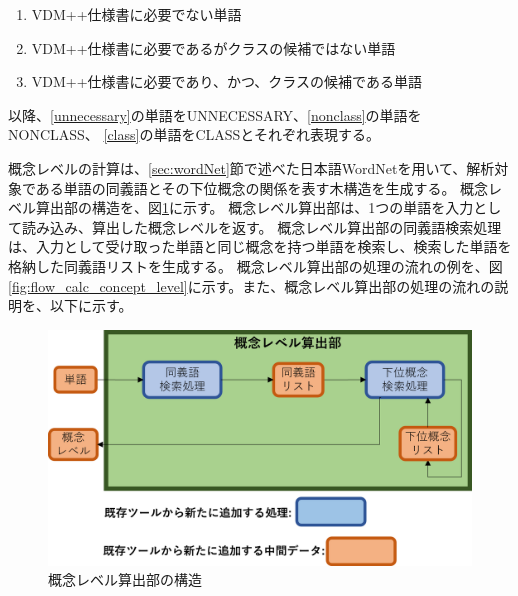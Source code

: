 \begin{enumerate}[label=\textbf{\Alph*}.]
    \item VDM++仕様書に必要でない単語
    \label{unnecessary}
    \item VDM++仕様書に必要であるがクラスの候補ではない単語
    \label{nonclass}
    \item VDM++仕様書に必要であり、かつ、クラスの候補である単語
    \label{class}
\end{enumerate}

以降、\ref{unnecessary}の単語をUNNECESSARY、\ref{nonclass}の単語をNONCLASS、
\ref{class}の単語をCLASSとそれぞれ表現する。

概念レベルの計算は、\ref{sec:wordNet}節で述べた日本語WordNetを用いて、解析対象である単語の同義語とその下位概念の関係を表す木構造を生成する。
概念レベル算出部の構造を、図\ref{fig:vgml_concept_level_structure}に示す。
概念レベル算出部は、1つの単語を入力として読み込み、算出した概念レベルを返す。
概念レベル算出部の同義語検索処理は、入力として受け取った単語と同じ概念を持つ単語を検索し、検索した単語を格納した同義語リストを生成する。
概念レベル算出部の処理の流れの例を、図\ref{fig:flow_calc_concept_level}に示す。また、概念レベル算出部の処理の流れの説明を、以下に示す。

\begin{figure}[t]
    \begin{center}
        \includegraphics[width=1.0\columnwidth]{image/vgml_concept_level_structure.png}
        \caption{概念レベル算出部の構造}
        \label{fig:vgml_concept_level_structure}
    \end{center}
\end{figure}

